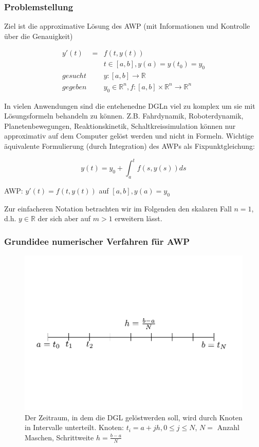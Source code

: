 \documentclass[10pt,a4paper]{article}
\begin{document}
\subsubsection{Problemstellung}
Ziel ist die approximative Lösung des AWP (mit Informationen und Kontrolle über die Genauigkeit)

\begin{eqnarray}
y'(t)	&=	&f(t,y(t)) \\
		&	& t\in [a,b], y(a)=y(t_0)=y_0  \nonumber \\
gesucht	&	& y:[a,b]\rightarrow\mathbb{R} \nonumber \\
gegeben	&	& y_0 \in \mathbb{R}^{n}, f:[a,b] \times \mathbb{R}^{n} \rightarrow \mathbb{R}^{n} \nonumber
\end{eqnarray}


In vielen Anwendungen sind die entehenedne DGLn viel zu komplex um sie mit Lösungsformeln behandeln zu können. Z.B. Fahrdynamik, Roboterdynamik, Planetenbewegungen, Reaktionskinetik, Schaltkreissimulation können nur approximativ auf dem Computer gelöst werden und nicht in Formeln. Wichtige äquivalente Formulierung (durch Integration) des AWPs als Fixpunktgleichung:

\begin{equation}
y(t)=y_0 + \int^{t}_a f(s,y(s)) ds
\end{equation}



AWP: $y'(t)=f(t,y(t))$ auf $[a,b], y(a)=y_0$

Zur einfacheren Notation betrachten wir im Folgenden den skalaren Fall $n=1$, d.h. $y \in \mathbb{R}$ der sich aber auf $m>1$ erweitern lässt.


\subsubsection{Grundidee numerischer Verfahren für AWP}

\begin{figure}[H]
\includegraphics[width=\textwidth]{images/knoten_einschrittverfahren}
\caption{Der Zeitraum, in dem die DGL gelöstwerden soll, wird durch Knoten in Intervalle unterteilt. Knoten: $ t_i = a + jh, 0 \leq j \leq N $, $N=$ Anzahl Maschen, Schrittweite $h=\frac{b-a}{N}$}
\end{figure}
\end{document}
